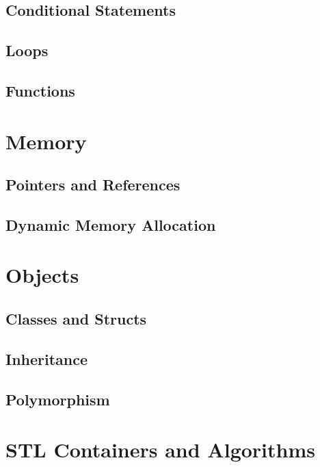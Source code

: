 \documentclass[11pt,fancy,authoryear]{elegantbook}
\begin{document}
\section{Conditional Statements}

\section{Loops}

\section{Functions}

\chapter{Memory}

\section{Pointers and References}

\section{Dynamic Memory Allocation}

\chapter{Objects}

\section{Classes and Structs}

\section{Inheritance}

\section{Polymorphism}

\chapter{STL Containers and Algorithms}
\end{document}
